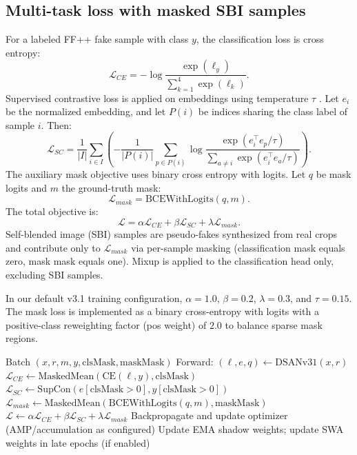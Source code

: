\documentclass[conference]{IEEEtran}
\begin{document}
\subsection{Multi-task loss with masked SBI samples}
For a labeled FF++ fake sample with class $y$, the classification loss is cross entropy:
\begin{equation}
\mathcal{L}_{CE} = -\log \frac{\exp(\ell_y)}{\sum_{k=1}^{4}\exp(\ell_k)}.
\end{equation}
Supervised contrastive loss is applied on embeddings using temperature $\tau$ \cite{Khosla2020SupCon}. Let $e_i$ be the normalized embedding, and let $P(i)$ be indices sharing the class label of sample $i$. Then:
\begin{equation}
\mathcal{L}_{SC} = \frac{1}{|I|}\sum_{i\in I} \left(
 -\frac{1}{|P(i)|}\sum_{p\in P(i)}
\log \frac{\exp(e_i^\top e_p/\tau)}{\sum_{a\neq i}\exp(e_i^\top e_a/\tau)}
\right).
\end{equation}
The auxiliary mask objective uses binary cross entropy with logits. Let $q$ be mask logits and $m$ the ground-truth mask:
\begin{equation}
\mathcal{L}_{mask} = \mathrm{BCEWithLogits}(q,m).
\end{equation}
The total objective is:
\begin{equation}
\mathcal{L} = \alpha \mathcal{L}_{CE} + \beta \mathcal{L}_{SC} + \lambda \mathcal{L}_{mask}.
\end{equation}
Self-blended image (SBI) samples \cite{Shiohara2022SBI} are pseudo-fakes synthesized from real crops and contribute only to $\mathcal{L}_{mask}$ via per-sample masking (classification mask equals zero, mask mask equals one). Mixup \cite{Zhang2018Mixup} is applied to the classification head only, excluding SBI samples.

In our default v3.1 training configuration, $\alpha=1.0$, $\beta=0.2$, $\lambda=0.3$, and $\tau=0.15$. The mask loss is implemented as a binary cross-entropy with logits with a positive-class reweighting factor (pos weight) of $2.0$ to balance sparse mask regions.

\begin{algorithm}[t]
\caption{DSAN v3.1 training step (multi-task, SBI-aware)}
\label{alg:dsantrain}
\begin{algorithmic}[1]
\REQUIRE Batch $(x, r, m, y, \mathrm{clsMask}, \mathrm{maskMask})$
\STATE Forward: $(\ell, e, q) \leftarrow \mathrm{DSANv31}(x, r)$
\STATE $\mathcal{L}_{CE} \leftarrow \mathrm{MaskedMean}(\mathrm{CE}(\ell,y), \mathrm{clsMask})$
\STATE $\mathcal{L}_{SC} \leftarrow \mathrm{SupCon}(e[\mathrm{clsMask}>0], y[\mathrm{clsMask}>0])$
\STATE $\mathcal{L}_{mask} \leftarrow \mathrm{MaskedMean}(\mathrm{BCEWithLogits}(q,m), \mathrm{maskMask})$
\STATE $\mathcal{L} \leftarrow \alpha\mathcal{L}_{CE} + \beta\mathcal{L}_{SC} + \lambda\mathcal{L}_{mask}$
\STATE Backpropagate and update optimizer (AMP/accumulation as configured)
\STATE Update EMA shadow weights; update SWA weights in late epochs (if enabled)
\end{algorithmic}
\end{algorithm}
\end{document}
